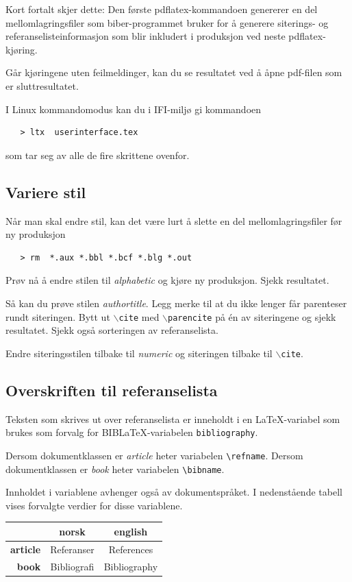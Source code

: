 \documentclass[11pt,norsk,a4paper]{article}
\newcommand{\kdo}[1]{\texttt{#1}}
\newcommand{\blt}{B{\smaller[2]IB}\discretionary{-}{}{\kern
    -0.12em}\LaTeX{}}
\begin{document}
Kort fortalt skjer dette: Den første pdflatex-kommandoen genererer en
del mellomlagringsfiler som biber-programmet bruker for å generere
siterings- og referanselisteinformasjon som blir inkludert i
produksjon ved neste pdflatex-kjøring.

Går kjøringene uten feilmeldinger, kan du se resultatet ved å åpne
pdf-filen som er sluttresultatet.

I Linux kommandomodus kan du i IFI-miljø gi kommandoen 
{\footnotesize\begin{verbatim}
   > ltx  userinterface.tex 
\end{verbatim}}
som tar seg av alle de fire skrittene ovenfor.
\subsection{Variere stil}
Når man skal endre stil, kan det være lurt å slette en del
mellomlagringsfiler før ny produksjon 

{\footnotesize\begin{verbatim}
   > rm  *.aux *.bbl *.bcf *.blg *.out 
\end{verbatim}}


Prøv nå å endre stilen til \textit{alphabetic} og kjøre ny produksjon. Sjekk
resultatet.

Så kan du prøve stilen \textit{authortitle}. Legg merke til at du ikke lenger
får parenteser rundt siteringen. Bytt ut \kdo{$\backslash$cite} med
\kdo{$\backslash$parencite} på én av siteringene og sjekk resultatet. Sjekk også sorteringen av
referanselista.

Endre siteringsstilen tilbake til \textit{numeric} og siteringen tilbake til \kdo{$\backslash$cite}.


\subsection{Overskriften til referanselista}
Teksten som skrives ut over referanselista er inneholdt i en
\LaTeX-variabel som brukes som forvalg for \blt{}-variabelen
\kdo{bibliography}.

Dersom dokumentklassen er \textit{article} heter
variabelen \verb=\refname=. Dersom dokumentklassen er \textit{book}
heter variabelen \verb=\bibname=.

Innholdet i variablene avhenger også av
dokumentspråket. I nedenstående tabell~ vises forvalgte verdier for
disse variablene.

\begin{center}
\begin{tabular}{|r|c|c|}\hline
        &\textbf{norsk}&\textbf{english}\\ \hline
\textbf{article}&Referanser&References\\ \hline
\textbf{book}&Bibliografi&Bibliography\\ \hline
\end{tabular}

\end{center}
\end{document}

